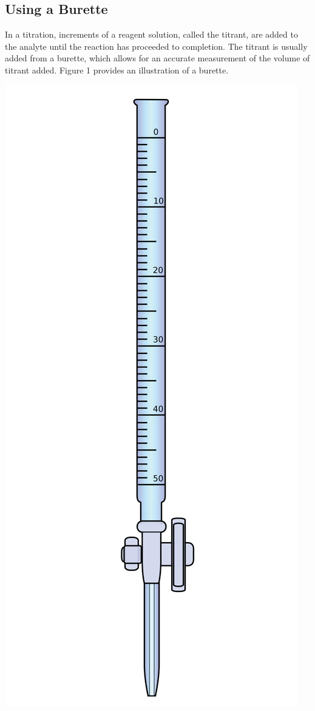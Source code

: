 \documentclass{article}
\begin{document}
\subsection{Using a Burette}
In a titration, increments of a reagent solution, called the titrant, are added to the analyte until
the reaction has proceeded to completion. The titrant is usually added from a burette, which allows
for an accurate measurement of the volume of titrant added.\cite{Harris}
Figure 1 provides an illustration of a burette.
\begin{center}
        \includegraphics[scale = 0.05]{buret}
\end{center}
\end{document}
